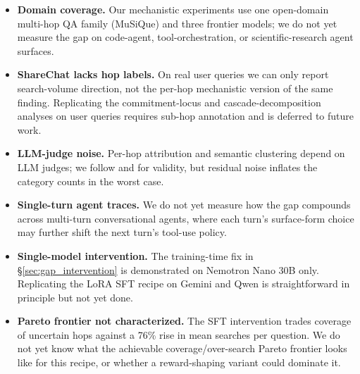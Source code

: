 \documentclass[10pt,letterpaper]{article}
\begin{document}
\begin{itemize}[leftmargin=*,topsep=0pt,itemsep=2pt]
  \item \textbf{Domain coverage.} Our mechanistic experiments use one
  open-domain multi-hop QA family (MuSiQue) and three frontier models; we do not
  yet measure the gap on code-agent, tool-orchestration, or scientific-research
  agent surfaces.
  \item \textbf{ShareChat lacks hop labels.} On real user queries we can only
  report search-volume direction, not the per-hop mechanistic version of the
  same finding. Replicating the commitment-locus and cascade-decomposition
  analyses on user queries requires sub-hop annotation and is deferred to
  future work.
  \item \textbf{LLM-judge noise.} Per-hop attribution and semantic clustering
  depend on LLM judges; we follow \citet{lee2025reasoningtraces} and
  \citet{han2025judgeverdict} for validity, but residual noise inflates the
  category counts in the worst case.
  \item \textbf{Single-turn agent traces.} We do not yet measure how the gap
  compounds across multi-turn conversational agents, where each turn's
  surface-form choice may further shift the next turn's tool-use policy.
  \item \textbf{Single-model intervention.} The training-time fix in
  \S\ref{sec:gap_intervention} is demonstrated on Nemotron Nano 30B only.
  Replicating the LoRA SFT recipe on Gemini and Qwen is straightforward in
  principle but not yet done.
  \item \textbf{Pareto frontier not characterized.} The SFT intervention trades
  coverage of uncertain hops against a 76\% rise in mean searches per question.
  We do not yet know what the achievable coverage/over-search Pareto frontier
  looks like for this recipe, or whether a reward-shaping variant could
  dominate it.
\end{itemize}
\end{document}
